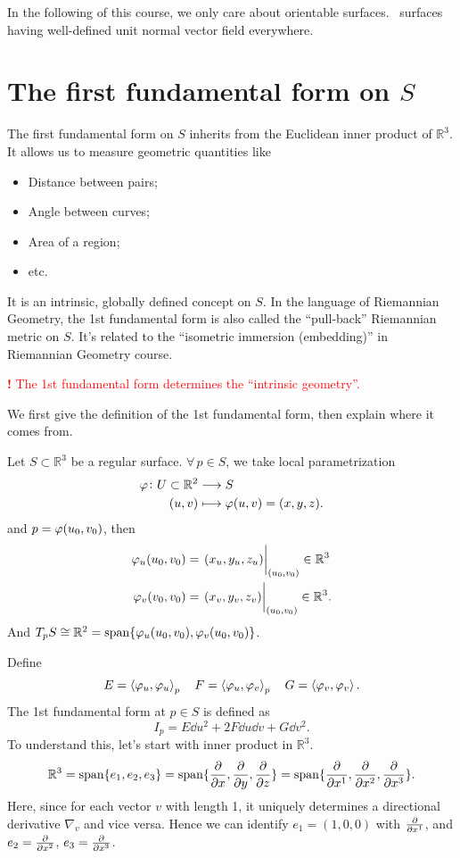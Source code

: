 \begin{remark}
    In the following of this course, we only care about orientable surfaces.
    \ie\ surfaces having well-defined unit normal vector field everywhere.
\end{remark}

\section{The first fundamental form on \(S\)}

The first fundamental form on \(S\) inherits from the Euclidean inner product of
\(\mathbb{R}^3\). It allows us to measure geometric quantities like
\begin{itemize}
    \item Distance between pairs;
    \item Angle between curves;
    \item Area of a region;
    \item etc.
\end{itemize}
It is an intrinsic, globally defined concept on \(S\). In the language of Riemannian
Geometry, the 1st fundamental form is also called the ``pull-back'' Riemannian
metric on \(S\). It's related to the ``isometric immersion (embedding)'' in 
Riemannian Geometry course.

\begin{center}
\textcolor{red}{
    \textbf{\large!} The 1st fundamental form determines the ``intrinsic
    geometry''.
}
\end{center}

We first give the definition of the 1st fundamental form, then explain where it
comes from.

Let \(S\subset \mathbb{R}^3\) be a regular surface. \(\forall\,p\in S\), we take
local parametrization
\begin{align*}
    \varphi\colon U\subset \mathbb{R}^2 &\longrightarrow S \\
    (u,v)&\longmapsto \varphi(u,v)=(x,y,z)
.\end{align*}
and \(p=\varphi(u_0,v_0)\), then 
\begin{align*}
    \vphi_u(u_0,v_0)&=\eval{(x_u,y_u,z_u)}_{(u_0,v_0)}\in \mathbb{R}^3 \\
    \vphi_v(v_0,v_0)&=\eval{(x_v,y_v,z_v)}_{(u_0,v_0)}\in \mathbb{R}^3
.\end{align*}
And \(T_p S\cong \mathbb{R}^2=\operatorname{span}\{\varphi_u(u_0,v_0),\varphi_v(u_0,v_0)\}\).

Define \[
    E=\left<\varphi_u,\varphi_u\right>_p\quad F=\left<\varphi_u,\varphi_v\right>_p\quad
    G=\left<\varphi_v,\varphi_v\right>.
\] The 1st fundamental form at \(p\in S\) is defined as \[
    I_p=E\dd{u}^2+2F\dd{u}\dd{v}+G\dd{v}^2
.\] To understand this, let's start with inner product in \(\mathbb{R}^3\). \[
    \mathbb{R}^3=\operatorname{span}\{e_1,e_2,e_3\}=\operatorname{span}\{\pdv{x},\pdv{y},\pdv{z}\}
    =\operatorname{span}\{\pdv{x^1},\pdv{x^2},\pdv{x^3}\}.
\] Here, since for each vector \(v\) with length 1, it uniquely determines a
directional derivative \(\nabla_v\) and vice versa.
Hence we can identify \(e_1=(1,0,0)\) with \(\pdv{x^1}\), and \(e_2=\pdv{x^2}\),
\(e_3=\pdv{x^3}\).

